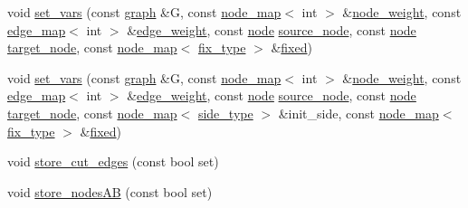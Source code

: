 \begin{DoxyCompactItemize}
\item 
void \mbox{\hyperlink{classratio__cut__partition_a2c09504b727a1b1d1e2f99a3a42de05b}{set\+\_\+vars}} (const \mbox{\hyperlink{classgraph}{graph}} \&G, const \mbox{\hyperlink{classnode__map}{node\+\_\+map}}$<$ int $>$ \&\mbox{\hyperlink{classratio__cut__partition_a4d9d2a9317a062f839ea7155c37b173f}{node\+\_\+weight}}, const \mbox{\hyperlink{classedge__map}{edge\+\_\+map}}$<$ int $>$ \&\mbox{\hyperlink{classratio__cut__partition_a48a85c82fb09b83c9d494d6d1232fab2}{edge\+\_\+weight}}, const \mbox{\hyperlink{classnode}{node}} \mbox{\hyperlink{classratio__cut__partition_abb18c3acafc590e258453d7a8d86bb49}{source\+\_\+node}}, const \mbox{\hyperlink{classnode}{node}} \mbox{\hyperlink{classratio__cut__partition_a343ba76869e64141fb795010e388744b}{target\+\_\+node}}, const \mbox{\hyperlink{classnode__map}{node\+\_\+map}}$<$ \mbox{\hyperlink{classratio__cut__partition_a558dda40abda8ab03edb4605dbb81e36}{fix\+\_\+type}} $>$ \&\mbox{\hyperlink{classratio__cut__partition_ad77023b9f60e88274bf54f2019404768}{fixed}})
\item 
void \mbox{\hyperlink{classratio__cut__partition_a0ed59d80c7e15d2865d6aa4657ae3f78}{set\+\_\+vars}} (const \mbox{\hyperlink{classgraph}{graph}} \&G, const \mbox{\hyperlink{classnode__map}{node\+\_\+map}}$<$ int $>$ \&\mbox{\hyperlink{classratio__cut__partition_a4d9d2a9317a062f839ea7155c37b173f}{node\+\_\+weight}}, const \mbox{\hyperlink{classedge__map}{edge\+\_\+map}}$<$ int $>$ \&\mbox{\hyperlink{classratio__cut__partition_a48a85c82fb09b83c9d494d6d1232fab2}{edge\+\_\+weight}}, const \mbox{\hyperlink{classnode}{node}} \mbox{\hyperlink{classratio__cut__partition_abb18c3acafc590e258453d7a8d86bb49}{source\+\_\+node}}, const \mbox{\hyperlink{classnode}{node}} \mbox{\hyperlink{classratio__cut__partition_a343ba76869e64141fb795010e388744b}{target\+\_\+node}}, const \mbox{\hyperlink{classnode__map}{node\+\_\+map}}$<$ \mbox{\hyperlink{classratio__cut__partition_ace53442bd0c1e21fbf00858ec6f6b456}{side\+\_\+type}} $>$ \&init\+\_\+side, const \mbox{\hyperlink{classnode__map}{node\+\_\+map}}$<$ \mbox{\hyperlink{classratio__cut__partition_a558dda40abda8ab03edb4605dbb81e36}{fix\+\_\+type}} $>$ \&\mbox{\hyperlink{classratio__cut__partition_ad77023b9f60e88274bf54f2019404768}{fixed}})
\item 
void \mbox{\hyperlink{classratio__cut__partition_af5a76fa0ecaf2c75792cc2c1574994c7}{store\+\_\+cut\+\_\+edges}} (const bool set)
\item 
void \mbox{\hyperlink{classratio__cut__partition_af0efdeab02cb235df47e2339c196051f}{store\+\_\+nodes\+AB}} (const bool set)

\end{DoxyCompactItemize}
